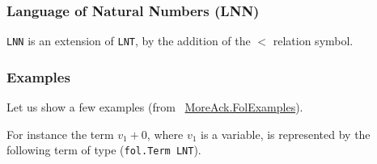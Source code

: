 \subsubsection{Language of Natural Numbers (LNN)}

\texttt{LNN} is an extension of \texttt{LNT}, by the addition 
of the $<$ relation symbol.





\subsubsection{Examples}

Let us show a few examples (from ~\href{../theories/html/hydras.MoreAck.FolExamples.html}{MoreAck.FolExamples}).

 
















For instance the term $v_1+0$, where $v_1$ is a variable,
is represented by the following \gallina term of type 
(\texttt{fol.Term LNT}).








